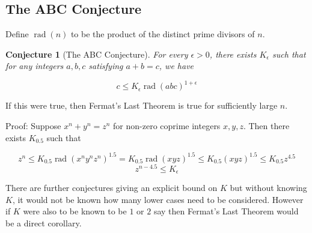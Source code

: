 \documentclass{article}
\newtheorem{conj}{Conjecture}[section]
\theoremstyle{definition}
\theoremstyle{definition}
\theoremstyle{definition}
\newcommand{\rad}{\operatorname{rad}}
\begin{document}

\subsection{The ABC Conjecture}\label{abc}
Define $\rad(n)$ to be the product of the distinct prime divisors of $n$.

\begin{conj}[The ABC Conjecture] For every $\epsilon>0$, there exists $K_{\epsilon}$ such that for any integers $a,b,c$ satisfying $a+b=c$, we have

$$c\leq K_{\epsilon}\rad(abc)^{1+\epsilon}$$
\end{conj}

If this were true, then Fermat's Last Theorem is true for sufficiently large $n$.

Proof: Suppose $x^n+y^n=z^n$ for non-zero coprime integers $x,y,z$. Then there exists $K_{0.5}$ such that

$$z^n\leq K_{0.5}\rad(x^ny^nz^n)^{1.5}=K_{0.5}\rad(xyz)^{1.5}\leq K_{0.5}(xyz)^{1.5}\leq K_{0.5}z^{4.5}$$
$$z^{n-4.5}\leq K_{\epsilon}$$

There are further conjectures giving an explicit bound on $K$ but without knowing $K$, it would not be known how many lower cases need to be considered. However if $K$ were also to be known to be $1$ or $2$ say then Fermat's Last Theorem would be a direct corollary.
\end{document}
